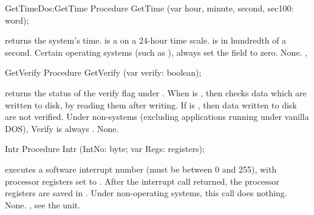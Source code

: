 \begin{procedurel}{GetTime}{Dos:GetTime}
\Declaration
Procedure GetTime (var hour, minute, second, sec100: word);
\Description

 returns the system's time.  is a on a 24-hour time
scale.  is in hundredth of a
second.
\Portability
Certain operating systems (such as \amiga), always set the  field
to zero.
\Errors
None.
\SeeAlso
{},
\end{procedurel}




\begin{procedure}{GetVerify}
\Declaration
Procedure GetVerify (var verify: boolean);
\Description

 returns the status of the verify flag under \dos. When
 is , then \dos checks data which are written to disk,
by reading them after writing. If  is , then data
written to disk are not verified.
\Portability
Under non-\dos systems (excluding \ostwo applications running under vanilla DOS),  
Verify is always .
\Errors
None.
\SeeAlso
{}
\end{procedure}
\begin{procedure}{Intr}
\Declaration
Procedure Intr (IntNo: byte; var Regs: registers);
\Description

 executes a software interrupt number  (must be between
0 and 255), with processor registers set to . After the interrupt call
returned, the processor registers are saved in .
\Portability
Under non-\dos operating systems, this call does nothing.
\Errors
None.
\SeeAlso
{}, see the \linux unit.
\end{procedure}

